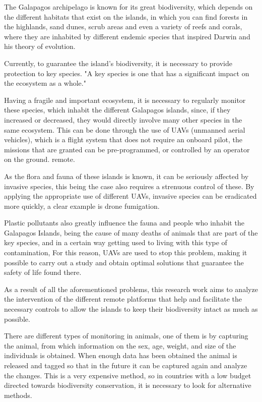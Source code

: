 \documentclass[10pt,english, openany]{book}
\begin{document}
The Galapagos archipelago is known for its great biodiversity, which depends on the different habitats that exist on the islands, in which you can find forests in the highlands, sand dunes, scrub areas and even a variety of reefs and corals, where they are inhabited by different endemic species that inspired Darwin and his theory of evolution.



Currently, to guarantee the island's biodiversity, it is necessary to provide protection to key species. "A key species is one that has a significant impact on the ecosystem as a whole." 

Having a fragile and important ecosystem, it is necessary to regularly monitor these species, which inhabit the different Galapagos islands, since, if they increased or decreased, they would directly involve many other species in the same ecosystem. This can be done through the use of UAVs (unmanned aerial vehicles), which is a flight system that does not require an onboard pilot, the missions that are granted can be pre-programmed, or controlled by an operator on the ground. remote. \cite{BenitoCarrasco2015}

As the flora and fauna of these islands is known, it can be seriously affected by invasive species, this being the case also requires a strenuous control of these. By applying the appropriate use of different UAVs, invasive species can be eradicated more quickly, a clear example is drone fumigation.

Plastic pollutants also greatly influence the fauna and people who inhabit the Galapagos Islands, being the cause of many deaths of animals that are part of the key species, and in a certain way getting used to living with this type of contamination, For this reason, UAVs are used to stop this problem, making it possible to carry out a study and obtain optimal solutions that guarantee the safety of life found there.

As a result of all the aforementioned problems, this research work aims to analyze the intervention of the different remote platforms that help and facilitate the necessary controls to allow the islands to keep their biodiversity intact as much as possible.

There are different types of monitoring in animals, one of them is by capturing the animal, from which information on the sex, age, weight, and size of the individuals is obtained. When enough data has been obtained the animal is released and tagged so that in the future it can be captured again and analyze the changes. This is a very expensive method, so in countries with a low budget directed towards biodiversity conservation, it is necessary to look for alternative methods.\cite{Arevalo2001}
\end{document}
